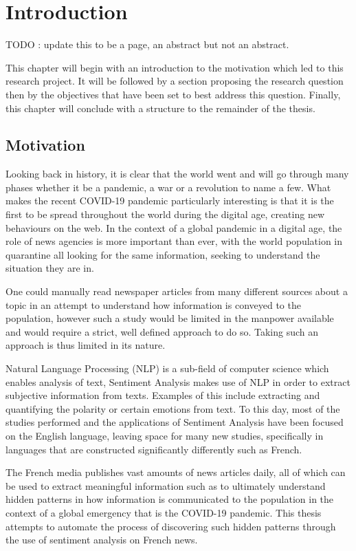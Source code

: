 \chapter{Introduction}\label{Introduction}
TODO : update this to be a page, an abstract but not an abstract.

This chapter will begin with an introduction to the motivation which led to this research project. It will be followed by a section proposing the research question then by the objectives that have been set to best address this question. Finally, this chapter will conclude with a structure to the remainder of the thesis.

\section{Motivation}\label{Motivation}
Looking back in history, it is clear that the world went and will go through many phases
whether it be a pandemic, a war or a revolution to name a few. What makes the recent COVID-19 pandemic particularly interesting is that it is the first to be spread throughout the world during the digital age, creating new behaviours on the web.   
In the context of a global pandemic in a digital age, the role of news agencies is more important than ever, with the world population in quarantine all looking for the same information, seeking to understand the situation they are in.

One could manually read newspaper articles from many different sources about a topic in an attempt to understand how information is conveyed to the population, however such a study would be limited in the manpower available and would require a strict, well defined approach to do so. Taking such an approach is thus limited in its nature.

Natural Language Processing (NLP) is a sub-field of computer science which enables analysis of text, Sentiment Analysis makes use of NLP in order to extract subjective information from texts. Examples of this include extracting and quantifying the polarity or certain emotions from text.
To this day, most of the studies performed and the applications of Sentiment Analysis have been focused on the English language, leaving space for many new studies, specifically in languages that are constructed significantly differently such as French.

The French media publishes vast amounts of news articles daily, all of which can be used to extract meaningful information such as to ultimately understand hidden patterns in how information is communicated to the population in the context of a global emergency that is the COVID-19 pandemic.
This thesis attempts to automate the process of discovering such hidden patterns through the use of sentiment analysis on French news.

